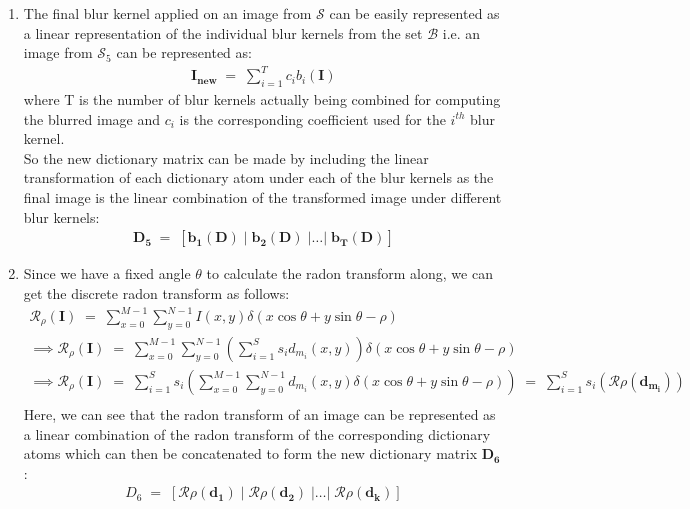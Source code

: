 \documentclass[11pt]{article}
\begin{document}
\begin{enumerate}
\begin{enumerate}
    \item The final blur kernel applied on an image from $\mathcal{S}$ can be easily represented as a linear representation of the individual blur kernels from the set $\mathcal{B}$ i.e. an image from $\mathcal{S}_5$ can be represented as:
    \begin{gather*}
        \mathbf{I_{new}}\;=\;\sum_{i=1}^Tc_ib_i(\mathbf{I})
    \end{gather*}
    where T is the number of blur kernels actually being combined for computing the blurred image and $c_i$ is the corresponding coefficient used for the $i^{th}$ blur kernel.\\
    So the new dictionary matrix can be made by including the linear transformation of each dictionary atom under each of the blur kernels as the final image is the linear combination of the transformed image under different blur kernels:
    \begin{gather*}
        \mathbf{D_5}\;=\;[\mathbf{b_1(D)}\;|\;\mathbf{b_2(D)}\;|\dots|\;\mathbf{b_T(D)}]
    \end{gather*}
    
    \item Since we have a fixed angle $\theta$ to calculate the radon transform along, we can get the discrete radon transform as follows:
    \begin{gather*}
        \mathcal{R}_\rho(\mathbf{I})\;=\;\sum_{x=0}^{M-1}\sum_{y=0}^{N-1}I(x,y)\delta(x\cos{\theta}+y\sin{\theta}-\rho)\\
        \implies \mathcal{R}_\rho(\mathbf{I})\;=\;\sum_{x=0}^{M-1}\sum_{y=0}^{N-1}\left(\sum_{i=1}^Ss_id_{m_i}(x,y)\right)\delta(x\cos{\theta}+y\sin{\theta}-\rho)\\
        \implies \mathcal{R}_\rho(\mathbf{I})\;=\;\sum_{i=1}^Ss_i\left(\sum_{x=0}^{M-1}\sum_{y=0}^{N-1}d_{m_i}(x,y)\delta(x\cos{\theta}+y\sin{\theta}-\rho)\right)\;=\;\sum_{i=1}^Ss_i\left(\mathcal{R}\rho(\mathbf{d_{m_i}})\right)\\
    \end{gather*}
    Here, we can see that the radon transform of an image can be represented as a linear combination of the radon transform of the corresponding dictionary atoms which can then be concatenated to form the new dictionary matrix $\mathbf{D_6}$:
    \begin{gather*}
        D_6\;=\;[\mathcal{R}\rho(\mathbf{d_1})\;|\;\mathcal{R}\rho(\mathbf{d_2})\;|\dots|\;\mathcal{R}\rho(\mathbf{d_k})]
    \end{gather*}
    

\end{enumerate}
\end{enumerate}
\end{document}
